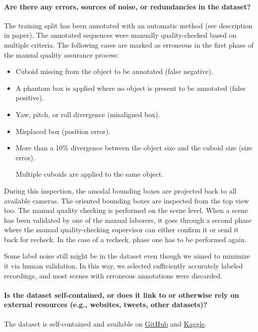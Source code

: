 \documentclass{article}
\begin{document}
\paragraph{Are there any errors, sources of noise, or redundancies in the dataset?} The training split has been annotated with an automatic method (see description in paper). 
The annotated sequences were manually quality-checked based on multiple criteria. The following cases are marked as erroneous in the first phase of the manual quality assurance process: 
\begin{itemize}
    \item Cuboid missing from the object to be annotated (false negative). 

    \item A phantom box is applied where no object is present to be annotated (false positive). 

    \item Yaw, pitch, or roll divergence (misaligned box). 

    \item Misplaced box (position error). 

    \item More than a 10\% divergence between the object size and the cuboid size (size error). 

Multiple cuboids are applied to the same object. 
\end{itemize}

During this inspection, the amodal bounding boxes are projected back to all available cameras. The oriented bounding boxes are inspected from the top view too. The manual quality checking is performed on the scene level. When a scene has been validated by one of the manual laborers, it goes through a second phase where the manual quality-checking supervisor can either confirm it or send it back for recheck. In the case of a recheck, phase one has to be performed again. 

Some label noise still might be in the dataset even though we aimed to minimize it via human validation. In this way, we selected sufficiently accurately labeled recordings, and most scenes with erroneous annotations were discarded.

\paragraph{Is the dataset self-contained, or does it link to or otherwise rely on external resources (e.g., websites, tweets, other datasets)?} The dataset is self-contained and available on \href{https://github.com/aimotive/aimotive_dataset}{GitHub} and \href{https://www.kaggle.com/datasets/tamasmatuszka/aimotive-multimodal-dataset}{Kaggle}.
\end{document}
